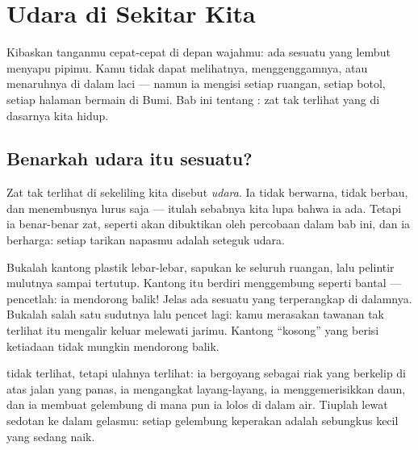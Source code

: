 \chapter{Udara di Sekitar Kita}\label{ch:g2:air-around-us}

Kibaskan tanganmu cepat-cepat di depan wajahmu: ada sesuatu yang
lembut menyapu pipimu. Kamu tidak dapat melihatnya, menggenggamnya,
atau menaruhnya di dalam laci --- namun ia mengisi setiap ruangan,
setiap botol, setiap halaman bermain di Bumi. Bab ini tentang :
zat tak terlihat yang di dasarnya kita hidup.

\section{Benarkah udara itu sesuatu?}

\begin{definition}[Udara]\label{def:g2:air-around-us:air}
Zat tak terlihat di sekeliling kita disebut \emph{udara}.
Ia tidak berwarna, tidak berbau, dan  menembusnya lurus saja ---
itulah sebabnya kita lupa bahwa ia ada. Tetapi ia benar-benar zat,
seperti akan dibuktikan oleh percobaan dalam bab ini, dan ia berharga:
setiap tarikan napasmu adalah seteguk udara.
\end{definition}

\begin{example}\label{ex:g2:air-around-us:catch}
Bukalah kantong plastik lebar-lebar, sapukan ke seluruh ruangan, lalu
pelintir mulutnya sampai tertutup. Kantong itu berdiri menggembung
seperti bantal --- pencetlah: ia mendorong balik! Jelas ada sesuatu
yang terperangkap di dalamnya. Bukalah salah satu sudutnya lalu pencet
lagi: kamu merasakan tawanan tak terlihat itu mengalir keluar melewati
jarimu. Kantong ``kosong'' yang berisi ketiadaan tidak mungkin
mendorong balik.
\end{example}

\begin{example}\label{ex:g2:air-around-us:shows}
 tidak terlihat, tetapi ulahnya terlihat: ia bergoyang sebagai
riak yang berkelip di atas jalan yang panas, ia mengangkat
layang-layang, ia menggemerisikkan daun, dan ia membuat gelembung di
mana pun ia lolos di dalam air. Tiuplah lewat sedotan ke dalam
gelasmu: setiap gelembung keperakan adalah sebungkus kecil  yang
sedang naik.
\end{example}

